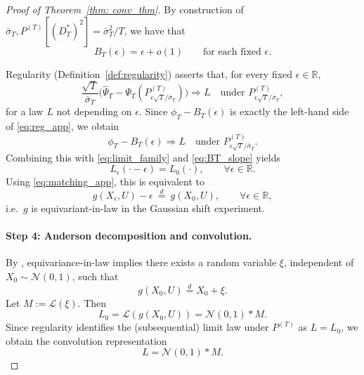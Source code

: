\documentclass[11pt]{article}
\begin{document}
\begin{proof}[Proof of Theorem~\ref{thm: conv_thm}]
By construction of $\bar\sigma_T, P^{(T)}[(D_T^*)^2]=\bar\sigma_T^2/T$, we have that
\begin{equation}\label{eq:BT_slope}
B_T(\epsilon)=\epsilon+o(1)
\qquad\text{for each fixed }\epsilon.
\end{equation}

Regularity (Definition~\ref{def:regularity}) asserts that, for every fixed
$\epsilon\in\mathbb R$,
\begin{equation}\label{eq:reg_app}
\frac{\sqrt{T}}{\bar\sigma_T}
\Big(\hat\Psi_T-\Psi_T(P^{(T)}_{\epsilon\sqrt{T}/\bar\sigma_T})\Big)
\Rightarrow L
\quad\text{under } P^{(T)}_{\epsilon\sqrt{T}/\bar\sigma_T},
\end{equation}
for a law $L$ not depending on $\epsilon$.
Since $\phi_T - B_T(\epsilon)$ is exactly the left-hand side of \eqref{eq:reg_app},
we obtain
\[
\phi_T - B_T(\epsilon)\Rightarrow L
\quad\text{under } P^{(T)}_{\epsilon\sqrt{T}/\bar\sigma_T}.
\]
Combining this with \eqref{eq:limit_family} and \eqref{eq:BT_slope} yields
\[
L_\epsilon(\cdot-\epsilon)=L_0(\cdot),
\qquad \forall \epsilon\in\mathbb R.
\]
Using \eqref{eq:matching_app}, this is equivalent to
\begin{equation}\label{eq:equivariance_app}
g(X_\epsilon,U)-\epsilon \ \stackrel d=\ g(X_0,U),
\qquad \forall \epsilon\in\mathbb R,
\end{equation}
i.e.\ $g$ is equivariant-in-law in the Gaussian shift experiment.

\paragraph{Step 4: Anderson decomposition and convolution.}
By \citep[Proposition~8.4]{vanderVaart1998asymptotic}, equivariance-in-law implies
there exists a random variable $\xi$, independent of
$X_0\sim\mathcal N(0,1)$, such that
\[
g(X_0,U)\stackrel d= X_0+\xi.
\]
Let $M:=\mathcal L(\xi)$. Then
\[
L_0=\mathcal L(g(X_0,U))=\mathcal N(0,1)\ast M.
\]
Since regularity identifies the (subsequential) limit law under $P^{(T)}$ as
$L=L_0$, we obtain the convolution representation
\[
L=\mathcal N(0,1)\ast M.
\]
\end{proof}
\end{document}
